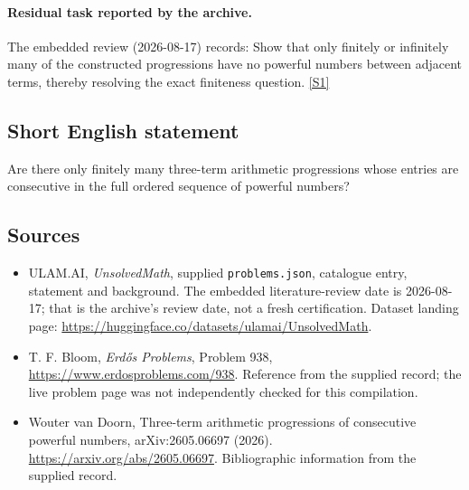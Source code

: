 \documentclass[11pt,a4paper]{article}
\newcommand{\sref}[2]{\hyperlink{source:#1:#2}{[S#2]}}
\begin{document}
\paragraph{Residual task reported by the archive.}

The embedded review (2026-08-17) records: Show that only finitely or infinitely many of the constructed progressions have no powerful numbers between adjacent terms, thereby resolving the exact finiteness question. \sref{statement}{1}

\subsection{Short English statement}

Are there only finitely many three-term arithmetic progressions whose entries are consecutive in the full ordered sequence of powerful numbers?

\subsection{Sources}

{\small

\begin{itemize}

\item[\hypertarget{source:statement:1}{S1}] ULAM.AI, \emph{UnsolvedMath}, supplied \texttt{problems.json}, catalogue entry, statement and background. The embedded literature-review date is 2026-08-17; that is the archive’s review date, not a fresh certification. Dataset landing page: \url{https://huggingface.co/datasets/ulamai/UnsolvedMath}.

\item[\hypertarget{source:statement:2}{S2}] T. F. Bloom, \emph{Erdős Problems}, Problem 938, \url{https://www.erdosproblems.com/938}. Reference from the supplied record; the live problem page was not independently checked for this compilation.

\item[\hypertarget{source:statement:3}{S3}] Wouter van Doorn, Three-term arithmetic progressions of consecutive powerful numbers, arXiv:2605.06697 (2026). \url{https://arxiv.org/abs/2605.06697}. Bibliographic information from the supplied record.

\end{itemize}

}

\label{end:statement}
\end{document}
